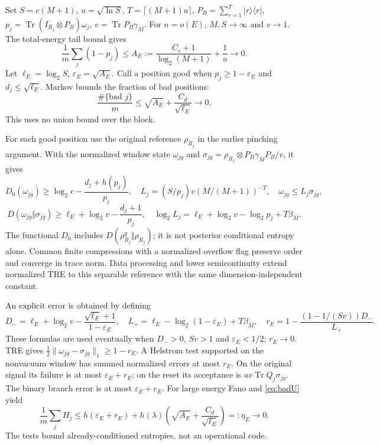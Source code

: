 \documentclass[11pt]{article}
\newcommand{\Tr}{\operatorname{Tr}}
\begin{document}
Set \(S=c(M+1)\), \(u=\sqrt{\ln S}\),
\(T=\lceil(M+1)u\rceil\), \(P_B=\sum_{r=1}^T|r\rangle\langle r|\),
\(p_j=\Tr(I_{R_j}\otimes P_B)\omega_j\), \(v=\Tr P_B\gamma_M\).
For \(n=o(E)\), \(M,S\to\infty\) and \(v\to1\). The total-energy
tail bound gives
\[
 \frac1m\sum_j(1-p_j)\le
 A_E:=\frac{C_s+1}{\log_2(M+1)}+\frac1u\longrightarrow0.
\]
Let \(\ell_E=\log_2S\), \(\varepsilon_E=\sqrt{A_E}\).
Call a position good when \(p_j\ge1-\varepsilon_E\) and
\(d_j\le\sqrt{\ell_E}\). Markov bounds the fraction of bad positions:
\begin{equation}
 \frac{\#\{\text{bad }j\}}m
 \le\sqrt{A_E}+\frac{C_d}{\sqrt{\ell_E}}\longrightarrow0.
 \tag{U7}\label{eq:badU}
\end{equation}
This uses no union bound over the block.

For each good position use the original reference \(\rho_{R_j}\)
in the earlier pinching argument. With the normalized window state
\(\omega_{jg}\) and
\(\sigma_{jg}=\rho_{R_j}\otimes P_B\gamma_MP_B/v\), it gives
\[
 D_0(\omega_{jg})\ge\log_2c-\frac{d_j+h(p_j)}{p_j},\quad
 L_j=(S/p_j)v(M/(M+1))^{-T},\quad \omega_{jg}\le L_j\sigma_{jg},
\]
\[
 D(\omega_{jg}\Vert\sigma_{jg})
 \ge\ell_E+\log_2v-\frac{d_j+1}{p_j},\quad
 \log_2L_j=\ell_E+\log_2v-\log_2p_j+T\beta_M .
\]
The functional \(D_0\) includes
\(D(\rho_{R_j}^g\Vert\rho_{R_j})\); it is not posterior conditional
entropy alone. Common finite compressions with a normalized overflow
flag preserve order and converge in trace norm. Data processing and
lower semicontinuity extend normalized TRE to this separable reference
with the same dimension-independent constant.

An explicit error is obtained by defining
\[
 D_-=\ell_E+\log_2v-\frac{\sqrt{\ell_E}+1}{1-\varepsilon_E},
 \quad L_+=\ell_E-\log_2(1-\varepsilon_E)+T\beta_M,\quad
 r_E=1-\frac{(1-1/(Sv))D_-}{L_+}.
\]
These formulas are used eventually when \(D_->0\), \(Sv>1\)
and \(\varepsilon_E<1/2\); \(r_E\to0\).
TRE gives \(\tfrac12\|\omega_{jg}-\sigma_{jg}\|_1\ge1-r_E\).
A Helstrom test supported on the nonvacuum window has summed normalized
errors at most \(r_E\). On the original signal its failure is at most
\(\varepsilon_E+r_E\); on the reset its acceptance is
\(av\Tr Q_j\sigma_{jg}\). The binary branch error is at most
\(\varepsilon_E+r_E\). For large energy Fano and \eqref{eq:badU} yield
\begin{equation}
 \frac1m\sum_jH_j
 \le h(\varepsilon_E+r_E)
       +h(\lambda)\left(\sqrt{A_E}+\frac{C_d}{\sqrt{\ell_E}}\right)
 =:\eta_E\longrightarrow0.                    \tag{U8}\label{eq:flagmeanU}
\end{equation}
The tests bound already-conditioned entropies, not an operational code.
\end{document}
